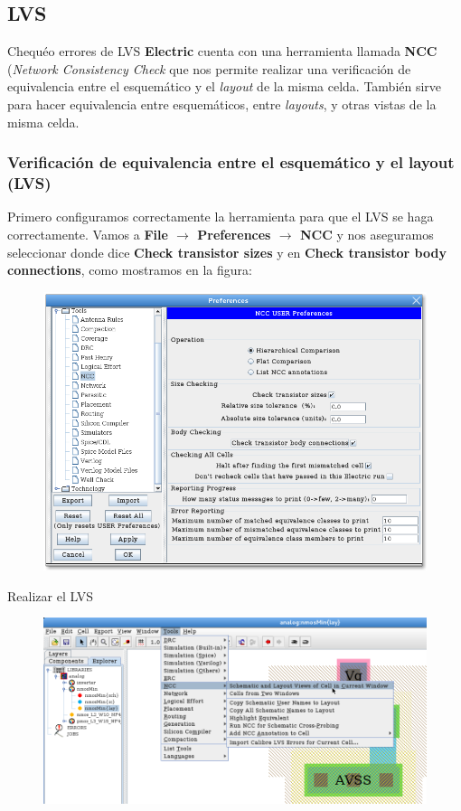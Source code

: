 \documentclass{beamer}
\begin{document}
\subsection{LVS}
\begin{frame}{Chequéo errores de LVS}
  \textbf{Electric} cuenta con una herramienta llamada \textbf{NCC} (\emph{Network Consistency Check} que nos permite realizar una verificación de equivalencia entre el esquemático y el \emph{layout} de la misma celda. También sirve para hacer equivalencia entre esquemáticos, entre \emph{layouts}, y otras vistas de la misma celda.
\end{frame}
\begin{frame}
\frametitle{Verificación de equivalencia entre el esquemático y el layout (LVS)}
\scriptsize{Primero configuramos correctamente la herramienta para que el LVS se haga correctamente. Vamos a \textbf{File $\rightarrow$ Preferences $\rightarrow$ NCC} y nos aseguramos seleccionar donde dice \textbf{Check transistor sizes} y en \textbf{Check transistor body connections}, como mostramos en la figura:
}
\begin{figure}
  \includegraphics[width=0.75\linewidth]{figuras/edicionElectric-12.png}
\end{figure}
\end{frame}
\begin{frame}{Realizar el LVS}
  \begin{figure}
    \includegraphics[width=1.10\linewidth]{figuras/edicionElectric-9c.png}
  \end{figure}
\end{frame}
\end{document}
